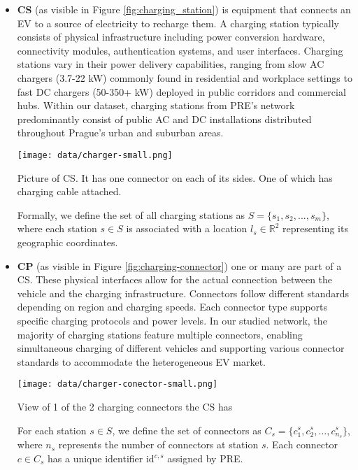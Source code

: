 \begin{itemize}
    \setlength\itemsep{1em}
    \item \textbf{\acrlong{CS}} (as visible in Figure \ref{fig:charging_station}) is equipment that connects an \acrshort{EV} to a source of electricity to recharge them. A charging station typically consists of physical infrastructure including power conversion hardware, connectivity modules, authentication systems, and user interfaces. Charging stations vary in their power delivery capabilities, ranging from slow AC chargers (3.7-22 kW) commonly found in residential and workplace settings to fast DC chargers (50-350+ kW) deployed in public corridors and commercial hubs. Within our dataset, charging stations from PRE's network predominantly consist of public AC and DC installations distributed throughout Prague's urban and suburban areas.

          \begin{marginfigure}
              \centering
              \texttt{[image: data/charger-small.png]}
              \caption{Picture of \acrlong{CS}. It has one connector on each of its sides. One of which has charging cable attached.}
              \label{fig:charging_station}
          \end{marginfigure}
          \vspace{3.5mm}
          Formally, we define the set of all charging stations as $S = \{s_1, s_2, ..., s_m\}$, where each station $s \in S$ is associated with a location $l_s \in \mathbb{R}^2$ representing its geographic coordinates.

    \item  \textbf{\acrlong{CP}} (as visible in Figure \ref{fig:charging-connector}) one or many are part of a \acrshort{CS}. These physical interfaces allow for the actual connection between the vehicle and the charging infrastructure. Connectors follow different standards depending on region and charging speeds. Each connector type supports specific charging protocols and power levels. In our studied network, the majority of charging stations feature multiple connectors, enabling simultaneous charging of different vehicles and supporting various connector standards to accommodate the heterogeneous EV market.

          \begin{marginfigure}
              \centering
              \texttt{[image: data/charger-conector-small.png]}
              \caption{View of 1 of the 2 charging connectors the \acrshort{CS} has}
              \label{fig:charging-connector}
          \end{marginfigure}
          \vspace{3.5mm}
          For each station $s \in S$, we define the set of connectors as $C_s = \{c_1^s, c_2^s, ..., c_{n_s}^s\}$, where $n_s$ represents the number of connectors at station $s$. Each connector $c \in C_s$ has a unique identifier $\text{id}^{c,s}$ assigned by PRE.


\end{itemize}
